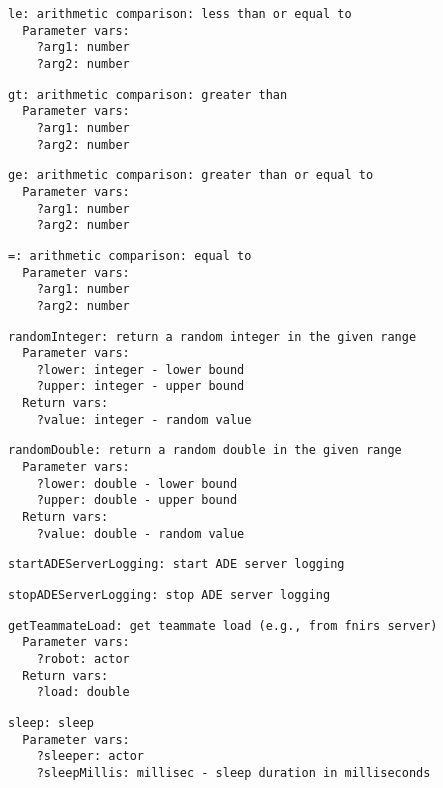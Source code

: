 \documentclass[11pt,letterpaper]{article}
\begin{document}
\begin{Verbatim}
le: arithmetic comparison: less than or equal to
  Parameter vars:
    ?arg1: number
    ?arg2: number
\end{Verbatim}

\begin{Verbatim}
gt: arithmetic comparison: greater than
  Parameter vars:
    ?arg1: number
    ?arg2: number
\end{Verbatim}

\begin{Verbatim}
ge: arithmetic comparison: greater than or equal to
  Parameter vars:
    ?arg1: number
    ?arg2: number
\end{Verbatim}

\begin{Verbatim}
=: arithmetic comparison: equal to
  Parameter vars:
    ?arg1: number
    ?arg2: number
\end{Verbatim}

\begin{Verbatim}
randomInteger: return a random integer in the given range
  Parameter vars:
    ?lower: integer - lower bound
    ?upper: integer - upper bound
  Return vars:
    ?value: integer - random value
\end{Verbatim}

\begin{Verbatim}
randomDouble: return a random double in the given range
  Parameter vars:
    ?lower: double - lower bound
    ?upper: double - upper bound
  Return vars:
    ?value: double - random value
\end{Verbatim}

\begin{Verbatim}
startADEServerLogging: start ADE server logging
\end{Verbatim}

\begin{Verbatim}
stopADEServerLogging: stop ADE server logging
\end{Verbatim}

\begin{Verbatim}
getTeammateLoad: get teammate load (e.g., from fnirs server)
  Parameter vars:
    ?robot: actor
  Return vars:
    ?load: double
\end{Verbatim}

\begin{Verbatim}
sleep: sleep
  Parameter vars:
    ?sleeper: actor
    ?sleepMillis: millisec - sleep duration in milliseconds
\end{Verbatim}
\end{document}
